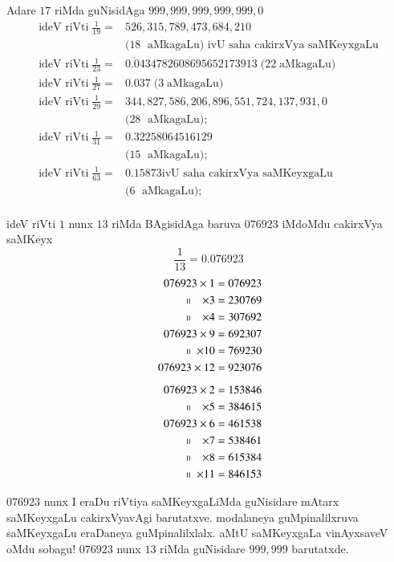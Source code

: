 Adare $17$ riMda guNisidAga $999,999,999,999,999,0$
\begin{align*}
\text{ideV riVti} \;\frac{1}{19} =& 526, 315, 789, 473, 684, 210\\
&(18\; \text{ aMkagaLu)  ivU saha cakirxVya saMKeyxgaLu}\\[0.1cm]
\text{ideV riVti}\; \frac{1}{23} = & 0.{\dot 0}43478260869565217391{\dot 3}\; (22 \;\text{aMkagaLu)}\\
\text{ideV riVti} \;\frac{1}{27} = & 0.037 \;(3 \;\text{aMkagaLu)}\\
\text{ideV riVti} \;\frac{1}{29} = & 344,827,586,206,896,551,724,137,931,0\\
&(28\; \text{ aMkagaLu)};\\
\text{ideV riVti} \;\frac{1}{31}=& 0.32258064516129\\
&(15\; \text{ aMkagaLu)};\\
\text{ideV riVti}\;\frac{1}{63}=& 0.15873 \text{ivU saha cakirxVya saMKeyxgaLu}\\
 &(6\; \text{ aMkagaLu)};\\
\end{align*}


ideV riVti $1$ nunx $13$ riMda BAgisidAga baruva $076923$ iMdoMdu cakirxVya saMKeyx
$$
\frac{1}{13} = 0.076923
$$
\begin{align*}
076923 \times 1 &= 076923 \\
~~~~~~~~~\shortparallel ~~~\times 3 &= 230769 \\ 
~~~~~~~~~\shortparallel ~~~\times 4 &= 307692 \\
076923\times 9 &= 692307 \\ 
~~~~~~~~~~~\shortparallel ~\times 10 &= 769230 \\
076923\times 12 &= 923076\\[5pt] 
076923 \times 2 &= 153846 \\
~~~~~~~~~\shortparallel ~~~\times 5 &= 384615 \\
076923   \times 6 &= 461538 \\
~~~~~~~~~\shortparallel ~~~\times 7 &= 538461 \\
~~~~~~~~~\shortparallel ~~~\times 8 &= 615384 \\
~~~~~~~~~~~\shortparallel ~\times 11 &= 846153 
\end{align*}

$076923$ nunx  I eraDu riVtiya saMKeyxgaLiMda guNisidare mAtarx saMKeyxgaLu cakirxVyavAgi barutatxve. modalaneya guMpinalilxruva saMKeyxgaLu eraDaneya guMpinalilxlalx. aMtU saMKeyxgaLa vinAyxsaveV oMdu sobagu! $076923$ nunx $13$ riMda guNisidare $999,999$ barutatxde.
